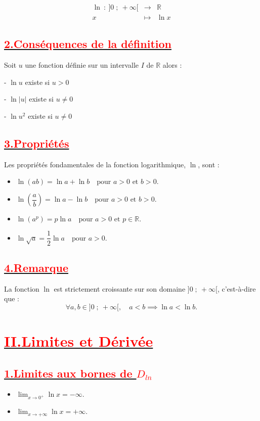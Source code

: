 \documentclass[12pt,a4paper]{article}
\begin{document}
$$\begin{array}{rcl}
\ln\ :\ ]0\;;\ +\infty[ & \longrightarrow & \mathbb{R} \\
x & \longmapsto & \ln x
\end{array}$$
\subsection*{\underline{\textbf{\textcolor{red}{2.Conséquences de la définition}}}}
Soit $u$ une fonction définie sur un intervalle $I$ de $\mathbb{R}$ alors :

- $\ln u$ existe si $u > 0$

- $\ln |u|$ existe si $u \neq 0$

- $\ln u^{2}$ existe si $u \neq 0$

\subsection*{\underline{\textbf{\textcolor{red}{3.Propriétés}}}}
Les propriétés fondamentales de la fonction logarithmique, $\ln$, sont :
\begin{itemize}
    \item 
    \(
    \ln(ab) = \ln a + \ln b \quad \text{pour } a > 0 \text{ et } b > 0.
    \)
    \item 
    \(
    \ln\left(\dfrac{a}{b}\right) = \ln a - \ln b \quad \text{pour } a > 0 \text{ et } b > 0.
    \)
    \item 
    \(
    \ln(a^p) = p \ln a \quad \text{pour } a > 0 \text{ et } p \in \mathbb{R}.
    \)
    \item 
    \(
    \ln\sqrt{a} = \dfrac{1}{2} \ln a \quad \text{pour } a > 0.
    \)
\end{itemize}

\subsection*{\underline{\textbf{\textcolor{red}{4.Remarque}}}}
La fonction $\ln$ est strictement croissante sur son domaine $]0\;;\ +\infty[$, c'est-à-dire que :
\[
\forall a, b \in ]0\;;\ +\infty[, \quad a < b \implies \ln a < \ln b.
\]

\section*{\underline{\textbf{\textcolor{red}{II.Limites et Dérivée}}}}

\subsection*{\underline{\textbf{\textcolor{red}{1.Limites aux bornes de $D_{ln}$}}}}
\begin{itemize}
    \item $\lim_{x \to 0^+} \ln x = -\infty$.
    \item $\lim_{x \to +\infty} \ln x = +\infty$.
\end{itemize}
\end{document}
